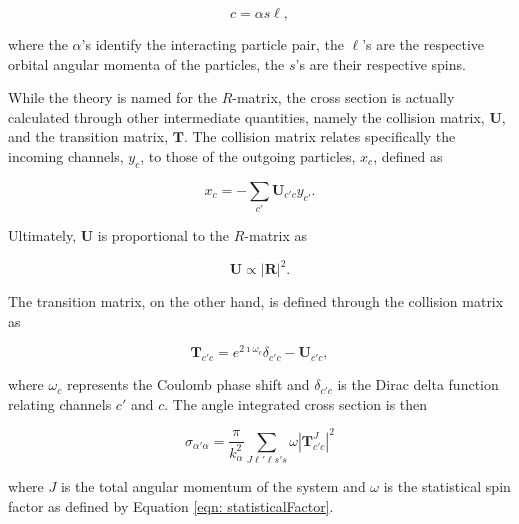 \begin{equation}
c = \alpha s \ell,
\end{equation}

\noindent where the $\alpha$'s identify the interacting particle pair, the $\ell$'s are the respective orbital angular momenta of the particles, the $s$'s are their respective spins.

While the theory is named for the $R$-matrix, the cross section is actually calculated through other intermediate quantities, namely the collision matrix, $\mathbf{U}$, and the transition matrix, $\mathbf{T}$. The collision matrix relates specifically the incoming channels, $y_{c}$, to those of the outgoing particles, $x_{c}$, defined as

\begin{equation}
x_{c} = - \sum_{c'} \mathbf{U}_{c' c} y_{c'}.
\end{equation}

\noindent Ultimately, $\mathbf{U}$ is proportional to the $R$-matrix as

\begin{equation}
\mathbf{U} \propto | \mathbf{R} |^{2}.
\end{equation}

\noindent The transition matrix, on the other hand, is defined through the collision matrix as 

\begin{equation}
\mathbf{T}_{c' c} = e^{2\imath \omega_{c}} \delta_{c' c} - \mathbf{U}_{c' c},
\end{equation}

\noindent where $\omega_{c}$ represents the Coulomb phase shift and $\delta_{c' c}$ is the Dirac delta function relating channels $c'$ and $c$. The angle integrated cross section is then 

\begin{equation}
\sigma_{\alpha' \alpha} = \dfrac{\pi}{k_{\alpha}^{2}} \sum_{J \ell' \ell s' s} \omega | \mathbf{T}_{c' c}^{J} |^{2}
\end{equation}

\noindent where $J$ is the total angular momentum of the system and $\omega$ is the statistical spin factor as defined by Equation \ref{eqn: statisticalFactor}. 

